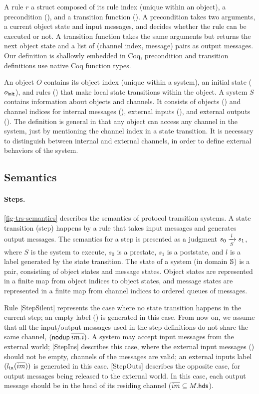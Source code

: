 \documentclass[sigplan,10pt,review,anonymous,screen]{acmart}\settopmatter{printfolios=true,printccs=false,printacmref=false}
\begin{document}
A rule $r$ a struct composed of its rule index (unique within an object), a precondition (), and a transition function ().
A precondition takes two arguments, a current object state and input messages, and decides whether the rule can be executed or not.
A transition function takes the same arguments but returns the next object state and a list of (channel index, message) pairs as output messages.
Our definition is shallowly embedded in Coq, \eg{} precondition and transition definitions use native Coq function types.

An object $O$ contains its object index (unique within a system), an initial state ($\objInit{o}$), and rules () that make local state transitions within the object.
A system $S$ contains information about objects and channels.
It consists of objects () and channel indices for internal messages (), external inputs (), and external outputs ().
The definition is general in that any object can access any channel in the system, just by mentioning the channel index in a state transition.
It is necessary to distinguish between internal and external channels, in order to define external behaviors of the system.

\subsection{Semantics}
\label{sec-semantics}

\paragraph{Steps.}
\autoref{fig-trs-semantics} describes the semantics of protocol transition systems.
A state transition (step) happens by a rule that takes input messages and generates output messages.
The semantics for a step is presented as a judgment $\semstep{S}{s_0}{l}{s_1}$, where $S$ is the system to execute, $s_0$ is a prestate, $s_1$ is a poststate, and $l$ is a label generated by the state transition.
The state of a system (in domain $\hstt{}$) is a pair, consisting of object states and message states.
Object states are represented in a finite map from object indices to object states, and message states are represented in a finite map from channel indices to ordered queues of messages.

Rule [StepSilent] represents the case where no state transition happens in the current step; an empty label (\lblEmpty{}) is generated in this case.
From now on, we assume that all the input/output messages used in the step definitions do not share the same channel, \ie{} $(\nodup{\listof{\idxOf{im}}})$.
A system may accept input messages from the external world; [StepIns] describes this case, where the external input messages () should not be empty, channels of the messages are valid; an external inputs label $(\lblIns{\listof{im}})$ is generated in this case.
[StepOuts] describes the opposite case, for output messages being released to the external world.
In this case, each output message should be in the head of its residing channel ($\listof{im} \subseteq \heads{M}$).
\end{document}
